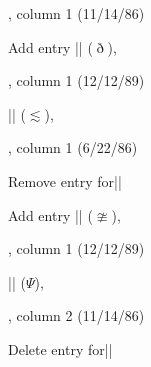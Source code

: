 
, column 1 (11/14/86)

Add entry\newline
|\eth| ($\eth$),

, column 1 (12/12/89)

\noindent
|\lesssim| ($\lesssim$),

, column 1 (6/22/86)

Remove entry for\quad |\napprox|

Add entry\newline
|\ncong| ($\ncong$),

, column 1 (12/12/89)

\noindent
|\Psi| ($\Psi$),

, column 2 (11/14/86)

Delete entry for\quad |\thorn|

\enddocument
